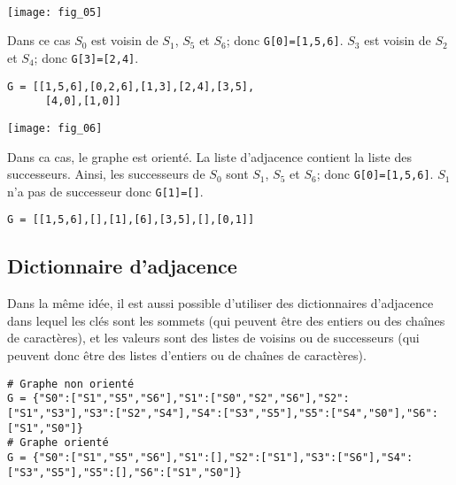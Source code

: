 \begin{exemple} ~\\
\begin{minipage}[b]{.47\linewidth}
\begin{center}
\texttt{[image: fig\_05]}
\end{center}
Dans ce cas $S_0$ est voisin de $S_1$, $S_5$ et $S_6$; donc \texttt{G[0]=[1,5,6]}. 
$S_3$ est voisin de $S_2$ et $S_4$; donc \texttt{G[3]=[2,4]}.
\begin{lstlisting}
G = [[1,5,6],[0,2,6],[1,3],[2,4],[3,5],
      [4,0],[1,0]]
\end{lstlisting}
\end{minipage}\hfill
\begin{minipage}[b]{.47\linewidth}
\begin{center}
\texttt{[image: fig\_06]}
\end{center}
Dans ca cas, le graphe est orienté. La liste d'adjacence contient la liste des successeurs. Ainsi, les successeurs de $S_0$ sont $S_1$, $S_5$ et $S_6$; donc \texttt{G[0]=[1,5,6]}. $S_1$ n'a pas de successeur donc \texttt{G[1]=[]}.
\begin{lstlisting}
G = [[1,5,6],[],[1],[6],[3,5],[],[0,1]]
\end{lstlisting}
\end{minipage}
\end{exemple}


\subsection{Dictionnaire d'adjacence}

Dans la même idée, il est aussi possible d'utiliser des dictionnaires d'adjacence dans lequel les clés sont les sommets (qui peuvent être des entiers ou des chaînes de caractères), et les valeurs sont des listes de voisins ou de successeurs (qui peuvent donc être des listes d'entiers ou de chaînes de caractères).

\begin{lstlisting}
# Graphe non orienté 
G = {"S0":["S1","S5","S6"],"S1":["S0","S2","S6"],"S2":["S1","S3"],"S3":["S2","S4"],"S4":["S3","S5"],"S5":["S4","S0"],"S6":["S1","S0"]}
# Graphe orienté 
G = {"S0":["S1","S5","S6"],"S1":[],"S2":["S1"],"S3":["S6"],"S4":["S3","S5"],"S5":[],"S6":["S1","S0"]}
\end{lstlisting}

